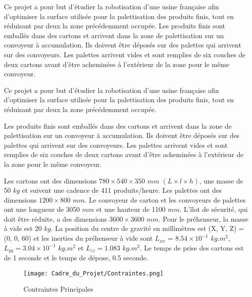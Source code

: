 \label{cadre}

Ce projet a pour but d’étudier la robotisation d’une usine française afin d'optimiser la surface utilisée pour la palettisation des produits finis, tout en réduisant par deux la zone précédemment occupée.
Les produits finis sont emballés dans des cartons et arrivent dans la zone de palettisation sur un convoyeur à accumulation. Ils doivent être déposés sur des palettes qui arrivent sur des convoyeurs. Les palettes arrivent vides et sont remplies de six couches de deux cartons avant d’être acheminées à l’extérieur de la zone pour le même convoyeur.


Ce projet a pour but d’étudier la robotisation d’une usine française afin d'optimiser la surface utilisée pour la palettisation des produits finis, tout en réduisant par deux la zone précédemment occupée.\par
Les produits finis sont emballés dans des cartons et arrivent dans la zone de palettisation sur un convoyeur à accumulation. Ils doivent être déposés sur des palettes qui arrivent sur des convoyeurs. Les palettes arrivent vides et sont remplies de six couches de deux cartons avant d’être acheminées à l’extérieur de la zone pour le même convoyeur.\par
Les cartons ont des dimensions $ 780 \times 540 \times 350$  $ mm $ $ (L \times l \times h) $, une masse de 50 $ kg $ et suivent une cadence de 411 produits/heure. Les palettes ont des dimensions $ 1200 \times 800 $ $ mm $. Le convoyeur de carton et les convoyeurs de palettes ont une longueur de 3050 $ mm $ et une hauteur de 1100 $ mm $. L’îlot de sécurité, qui doit être réduite, a des dimensions $ 3600 \times 3600 $ $ mm $.  
Pour le préhenseur, la masse à vide est 20 $ kg $. La position du centre de gravité en millimètres est (X, Y, Z) = (0, 0, 60) et les inerties du préhenseur à vide sont $ L_{xx} $ = $ 8.54 \times 10^{-1}$  $ kg.m^2 $, $ L_{yy} = 3.04 \times 10^{-1}$  $ kg.m^2 $ et $ L_{zz} = 1.083$  $ kg.m^2 $. Le temps de prise des cartons est de 1 seconde et le temps de dépose, 0.5 seconde. 

\begin{figure}[H]
	\begin{center}	
		\texttt{[image: Cadre\_du\_Projet/Contraintes.png]}
		\caption{Contraintes Principales}
		\label{fig:Contraintes}
	\end{center}
\end{figure}
 
